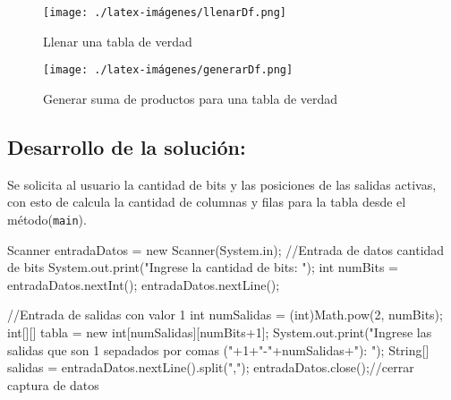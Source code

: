 \begin{figure}[h!]
    \centering
    \texttt{[image: ./latex-imágenes/llenarDf.png]}
    \caption{Llenar una tabla de verdad}
    \label{fig:enter-label}
\end{figure}

\begin{figure}[h!]
    \centering
    \texttt{[image: ./latex-imágenes/generarDf.png]}
    \caption{Generar suma de productos para una tabla de verdad}
    \label{fig:enter-label}
\end{figure}
\newpage

\subsection{\textbf{Desarrollo de la solución:}}

Se solicita al usuario la cantidad de bits y las posiciones de las salidas activas, con esto de calcula la cantidad de columnas y filas para la tabla desde el método(\texttt{main}).
\begin{javaCode}
Scanner entradaDatos = new Scanner(System.in);
    //Entrada de datos cantidad de bits 
    System.out.print("Ingrese la cantidad de bits: ");
    int numBits = entradaDatos.nextInt();
    entradaDatos.nextLine();
    
    //Entrada de salidas con valor 1
    int numSalidas = (int)Math.pow(2, numBits);
    int[][] tabla = new int[numSalidas][numBits+1];
    System.out.print("Ingrese las salidas que son 1 sepadados por comas ("+1+"-"+numSalidas+"): ");
    String[] salidas = entradaDatos.nextLine().split(",");
    entradaDatos.close();//cerrar captura de datos
\end{javaCode}

